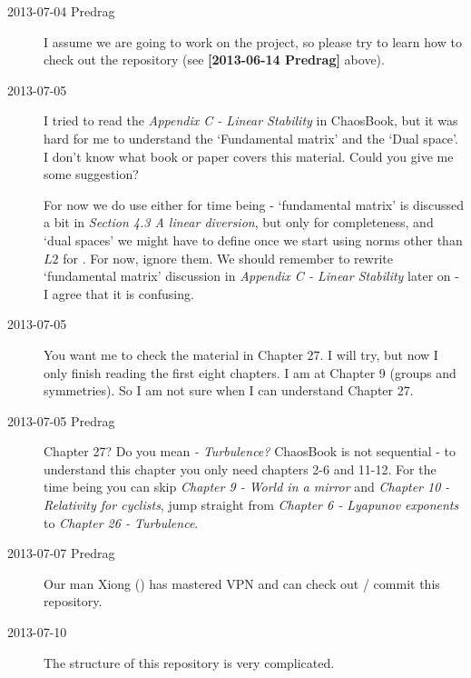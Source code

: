 \begin{description}
\item[2013-07-04 Predrag] I assume we are going to work on the
    {\cLvs} project, so please try to learn how to check out
    the repository (see {\bf [2013-06-14 Predrag]} above).

\item[2013-07-05 \XD] I tried to read the \emph{Appendix C - Linear
    Stability} in ChaosBook, but it was hard for me to understand the
    `Fundamental matrix' and the `Dual space'. I don't know what book
    or paper covers this material. Could you give me some suggestion?

For now we do use either for time being - `fundamental matrix' is
discussed a bit in
\emph{ {Section 4.3} A
linear diversion}, but only for completeness, and `dual spaces' we might
have to define once we start using norms other than $L2$ for \KS. For
now, ignore them. We should remember to rewrite `fundamental matrix'
discussion in
\emph{ {Appendix
C} - Linear Stability} later on - I agree that it is confusing.

\item[2013-07-05 \XD]
You want me to check the material in Chapter 27. I
will try, but now I only finish reading the first eight chapters. I am
at Chapter 9 (groups and symmetries). So I am not sure when I can
understand Chapter 27.

\item[2013-07-05 Predrag] Chapter 27? Do you mean \emph{
 - Turbulence?}
ChaosBook is not sequential - to understand this chapter you only need
chapters 2-6 and 11-12. For the time being you can skip
{\em Chapter 9 - World in a mirror} and
{\em Chapter 10 - Relativity for cyclists}, jump straight from
{\em Chapter 6 - Lyapunov exponents} to {\em {Chapter 26} - Turbulence}.

\item[2013-07-07 Predrag] Our man Xiong
()
has mastered VPN and can check out / commit this repository.

\item[2013-07-10 \XD]
The structure of this repository is very complicated.


\end{description}
